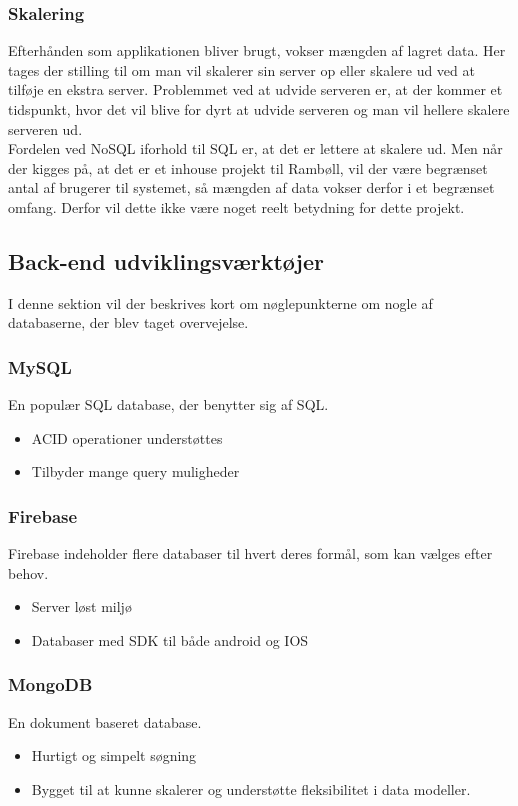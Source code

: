 \subsubsection{Skalering}
Efterhånden som applikationen bliver brugt, vokser mængden af lagret data. Her tages der stilling til om man vil skalerer sin server op eller skalere ud ved at tilføje en ekstra server. Problemmet ved at udvide serveren er, at der kommer et tidspunkt, hvor det vil blive for dyrt at udvide serveren og man vil hellere skalere serveren ud. \\
Fordelen ved NoSQL iforhold til SQL er, at det er lettere at skalere ud. Men
når der kigges på, at det er et inhouse projekt til Rambøll, vil der være begrænset antal af brugerer til systemet, så mængden af data vokser derfor i et begrænset omfang. 
Derfor vil dette ikke være noget reelt betydning for dette projekt.

\subsection{Back-end udviklingsværktøjer}
I denne sektion vil der beskrives kort om nøglepunkterne om nogle af databaserne, der blev taget overvejelse. 

\subsubsection{MySQL\cite{MySQL}}
En populær SQL database, der benytter sig af SQL.
\begin{itemize}[-]
	\item ACID\cite{ACID} operationer understøttes
	\item Tilbyder mange query muligheder
\end{itemize}

\subsubsection{Firebase\cite{Firebase}}
Firebase indeholder flere databaser til hvert deres formål, som kan vælges efter behov. 
\begin{itemize}[-]
	\item Server løst miljø
	\item Databaser med SDK til både android og IOS
\end{itemize}

\subsubsection{MongoDB\cite{mongoDB}}
En dokument baseret database.
\begin{itemize}[-]
	\item Hurtigt og simpelt søgning
	\item Bygget til at kunne skalerer og understøtte fleksibilitet i data modeller.  \\
	
\end{itemize}

